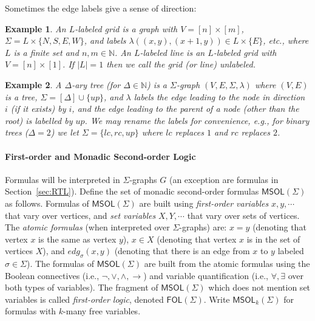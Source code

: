 \documentclass{aamas2015}
\newtheorem{example}{Example}
\def\nat{\mathbb{N}}
\def\fol{\mathsf{FOL}}
\def\msol{\mathsf{MSOL}}
\begin{document}
Sometimes the edge labels give a sense of direction:

\begin{example} An {\em $L$-labeled grid} is a graph with $V = [n] \times [m]$, $\Sigma =  L \times \{N,S,E,W\}$, and labels $\lambda((x,y),(x+1,y)) \in L \times \{E\}$, etc., where $L$ is a finite set and $n,m \in \nat$. An {\em $L$-labeled line} is an $L$-labeled grid with $V = [n] \times [1]$. If $|L| = 1$ then we call the grid (or line) {\em unlabeled}.
\end{example}

\begin{example}
A {\em $\Delta$-ary tree} (for $\Delta \in \nat$) is a $\Sigma$-graph $(V,E,\Sigma,\lambda)$ where $(V,E)$ is a tree, $\Sigma = [\Delta] \cup \{up\}$, and $\lambda$ labels the edge leading to the node in direction $i$ (if it exists) by $i$, and the edge leading to the parent of a node (other than the root) is labelled by $up$. We may rename the labels for convenience, e.g., for binary trees ($\Delta = 2$) we let $\Sigma = \{lc,rc,up\}$ where $lc$ replaces $1$ and $rc$ replaces $2$. 
\end{example}





\paragraph{First-order and Monadic Second-order Logic} \label{dfn:msol} Formulas will be interpreted in $\Sigma$-graphs $G$ (an exception are formulas in Section~\ref{sec:RTL}). Define the set of monadic second-order formulas $\msol(\Sigma)$ as follows. Formulas of $\msol(\Sigma)$ are built using {\em first-order variables} $x,y,\cdots$ that vary over vertices, and {\em set variables} $X,Y, \cdots$ that vary over sets of vertices. The {\em atomic formulas} (when interpreted over $\Sigma$-graphs) are: $x = y$ (denoting that vertex $x$ is the same as vertex $y$), $x \in X$ (denoting that vertex $x$ is in the set of vertices $X$), and $edg_\sigma(x,y)$ (denoting that there is an edge from $x$ to $y$ labeled $\sigma \in \Sigma$). The formulas of $\msol(\Sigma)$ are built from the atomic  formulas using the Boolean connectives (i.e., $\neg,\vee, \wedge, \to$) and variable quantification (i.e., $\forall,\exists$ over both types of variables). The fragment of $\msol(\Sigma)$ which does not mention set variables is called {\em first-order logic}, denoted $\fol(\Sigma)$. Write $\msol_k(\Sigma)$ for formulas with $k$-many free variables.
\end{document}
